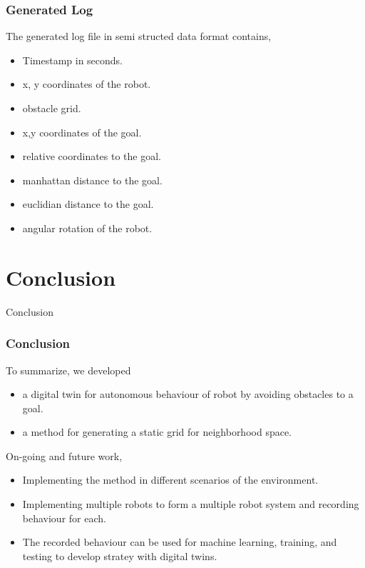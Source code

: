 \documentclass{beamer}
\begin{document}
\begin{frame}
    \frametitle{Generated Log}
    The generated log file in semi structed data format contains,
    \begin{itemize}
        \item Timestamp in seconds.
        \item x, y coordinates of the robot.
        \item obstacle grid.
        \item x,y coordinates of the goal.
        \item relative coordinates to the goal.
        \item manhattan distance to the goal.
        \item euclidian distance to the goal.
        \item angular rotation of the robot.
    \end{itemize}
\end{frame}

\section{Conclusion}

\begin{frame}
    \Huge{\centerline{Conclusion}}
\end{frame}

\begin{frame}
    \frametitle{Conclusion}
    To summarize, we developed
    \begin{itemize} 
        \item a digital twin for autonomous behaviour of robot by avoiding obstacles to a goal.
        \item a method for generating a static grid for neighborhood space.
    \end{itemize}
    On-going and future work,
    \begin{itemize}
        \item Implementing the method in different scenarios of the environment.
        \item Implementing multiple robots to form a multiple robot system and recording behaviour for each.
        \item The recorded behaviour can be used for machine learning, training, and testing to develop stratey with digital twins.
    \end{itemize}
\end{frame}
\end{document}
